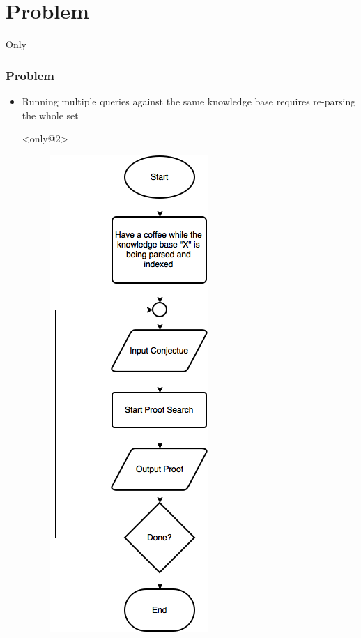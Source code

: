 \documentclass[10pt]{beamer}
\begin{document}
\section{Problem}
\begin{frame}[fragile]{Only}
  \frametitle{Problem}
  \begin{itemize}
    \item<only@1,3>Running multiple queries against the same knowledge base requires re-parsing the whole set

  \item[]<only@2> \begin{figure} \includegraphics[width=\linewidth,height=\textheight,keepaspectratio]{imgs/NewDeductionFC.png} \end{figure}

\end{itemize}
\end{frame}
\end{document}
